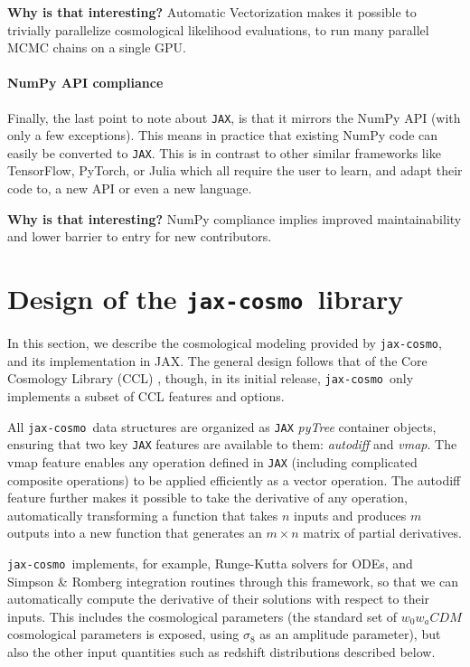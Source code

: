 \documentclass[twocolumn,twocolappendix,nofootinbib,iop]{openjournal}
\newcommand{\jaxcosmo}{\texttt{jax-cosmo}}
\begin{document}
\textbf{Why is that interesting?} Automatic Vectorization makes it possible to trivially parallelize cosmological likelihood evaluations, to run many parallel MCMC chains on a single GPU.

\paragraph{\textbf{NumPy API compliance}} Finally, the last point to note about \texttt{JAX}, is that it mirrors the NumPy API (with only a few exceptions). This means in practice that existing NumPy code can easily be converted to \texttt{JAX}. This is in contrast to other similar frameworks like TensorFlow, PyTorch, or Julia which all require the user to learn, and adapt their code to, a new API or even a new language. 

\textbf{Why is that interesting?} NumPy compliance implies improved maintainability and lower barrier to entry for new contributors.


\section{Design of the \jaxcosmo\ library}
\label{sec-jaxcosmo-design}

In this section, we describe the cosmological modeling provided by \jaxcosmo, and its implementation in JAX. The general design follows that of the Core Cosmology Library (CCL) \citep{2019ApJS..242....2C}, though, in its initial release,
 \jaxcosmo\ only implements a subset of CCL features and options.

All \jaxcosmo\ data structures are organized as \texttt{JAX} \textit{pyTree} container objects, ensuring that two key \texttt{JAX} features are available to them: \textit{autodiff} and \textit{vmap}. The vmap feature enables any operation defined in \texttt{JAX} (including complicated composite operations) to be applied efficiently as a vector operation. The autodiff feature further makes it possible to take the derivative of any operation, automatically transforming a function that takes $n$ inputs and produces $m$ outputs into a new function that generates an $m \times n$ matrix of partial derivatives.

\jaxcosmo\ implements, for example, Runge-Kutta solvers for ODEs, and Simpson \& Romberg integration routines through this framework, so that we can automatically compute the derivative of their solutions with respect to their inputs. This includes the cosmological parameters (the standard set of $w_0 w_a CDM$ cosmological parameters is exposed, using $\sigma_8$ as an amplitude parameter), but also the other input quantities such as redshift distributions described below.
\end{document}
